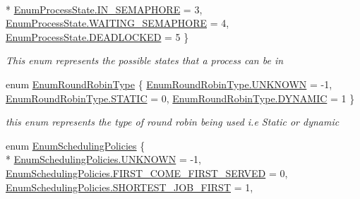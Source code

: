 \begin{DoxyCompactItemize}
\\*
\hyperlink{namespace_c_p_u___o_s___simulator_1_1_operating___system_a836ee2204e78fcb3a7dd6c3c942b1a24a9e8957c612920c788ec947d98e0af024}{Enum\+Process\+State.\+I\+N\+\_\+\+S\+E\+M\+A\+P\+H\+O\+R\+E} = 3, 
\hyperlink{namespace_c_p_u___o_s___simulator_1_1_operating___system_a836ee2204e78fcb3a7dd6c3c942b1a24af46b873115ba21acbd559e7f2e1aca0c}{Enum\+Process\+State.\+W\+A\+I\+T\+I\+N\+G\+\_\+\+S\+E\+M\+A\+P\+H\+O\+R\+E} = 4, 
\hyperlink{namespace_c_p_u___o_s___simulator_1_1_operating___system_a836ee2204e78fcb3a7dd6c3c942b1a24a0550134156d1220fe47b905f3da1080f}{Enum\+Process\+State.\+D\+E\+A\+D\+L\+O\+C\+K\+E\+D} = 5
 \}\begin{DoxyCompactList}\small\item\em This enum represents the possible states that a process can be in \end{DoxyCompactList}
\item 
enum \hyperlink{namespace_c_p_u___o_s___simulator_1_1_operating___system_a4c7effb8b6725df52018a3a14cede96e}{Enum\+Round\+Robin\+Type} \{ \hyperlink{namespace_c_p_u___o_s___simulator_1_1_operating___system_a4c7effb8b6725df52018a3a14cede96ea696b031073e74bf2cb98e5ef201d4aa3}{Enum\+Round\+Robin\+Type.\+U\+N\+K\+N\+O\+W\+N} = -\/1, 
\hyperlink{namespace_c_p_u___o_s___simulator_1_1_operating___system_a4c7effb8b6725df52018a3a14cede96eafe6f99ef1ec99efbdc19a9786cf1facc}{Enum\+Round\+Robin\+Type.\+S\+T\+A\+T\+I\+C} = 0, 
\hyperlink{namespace_c_p_u___o_s___simulator_1_1_operating___system_a4c7effb8b6725df52018a3a14cede96ea0fcc90da4811c877ba9f9c12f7d60bc9}{Enum\+Round\+Robin\+Type.\+D\+Y\+N\+A\+M\+I\+C} = 1
 \}\begin{DoxyCompactList}\small\item\em this enum represents the type of round robin being used i.\+e Static or dynamic \end{DoxyCompactList}
\item 
enum \hyperlink{namespace_c_p_u___o_s___simulator_1_1_operating___system_ad0cdaacf9652394d23fa29109640fe08}{Enum\+Scheduling\+Policies} \{ \\*
\hyperlink{namespace_c_p_u___o_s___simulator_1_1_operating___system_ad0cdaacf9652394d23fa29109640fe08a696b031073e74bf2cb98e5ef201d4aa3}{Enum\+Scheduling\+Policies.\+U\+N\+K\+N\+O\+W\+N} = -\/1, 
\hyperlink{namespace_c_p_u___o_s___simulator_1_1_operating___system_ad0cdaacf9652394d23fa29109640fe08ae39fb551e5657a3c31eff06f11508d59}{Enum\+Scheduling\+Policies.\+F\+I\+R\+S\+T\+\_\+\+C\+O\+M\+E\+\_\+\+F\+I\+R\+S\+T\+\_\+\+S\+E\+R\+V\+E\+D} = 0, 
\hyperlink{namespace_c_p_u___o_s___simulator_1_1_operating___system_ad0cdaacf9652394d23fa29109640fe08aa5ffbf66adc3cfaa95173a6278f573dc}{Enum\+Scheduling\+Policies.\+S\+H\+O\+R\+T\+E\+S\+T\+\_\+\+J\+O\+B\+\_\+\+F\+I\+R\+S\+T} = 1, 

\end{DoxyCompactItemize}
